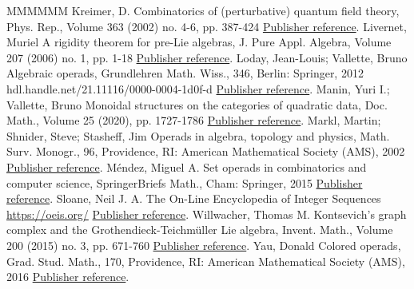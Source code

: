\documentclass[11pt]{article}
\theoremstyle{definition}
\numberwithin{equation}{section}
\begin{document}
\begin{thebibliography}{MMMMMM}
 Kreimer, D. Combinatorics of (perturbative) quantum field theory, Phys. Rep., Volume 363 (2002) no. 4-6, pp. 387-424 \href{https://alco.centre-mersenne.org/articles/10.5802/alco.442/#Kreimer:2000ja}{Publisher reference}.
 Livernet, Muriel A rigidity theorem for pre-Lie algebras, J. Pure Appl. Algebra, Volume 207 (2006) no. 1, pp. 1-18 \href{https://alco.centre-mersenne.org/articles/10.5802/alco.442/#Liv06}{Publisher reference}.
 Loday, Jean-Louis; Vallette, Bruno Algebraic operads, Grundlehren Math. Wiss., 346, Berlin: Springer, 2012 hdl.handle.net/21.11116/0000-0004-1d0f-d \href{https://alco.centre-mersenne.org/articles/10.5802/alco.442/#LV12}{Publisher reference}.
 Manin, Yuri I.; Vallette, Bruno Monoidal structures on the categories of quadratic data, Doc. Math., Volume 25 (2020), pp. 1727-1786 \href{https://alco.centre-mersenne.org/articles/10.5802/alco.442/#MV19}{Publisher reference}.
 Markl, Martin; Shnider, Steve; Stasheff, Jim Operads in algebra, topology and physics, Math. Surv. Monogr., 96, Providence, RI: American Mathematical Society (AMS), 2002 \href{https://alco.centre-mersenne.org/articles/10.5802/alco.442/#MSJ02}{Publisher reference}.
 Méndez, Miguel A. Set operads in combinatorics and computer science, SpringerBriefs Math., Cham: Springer, 2015 \href{https://alco.centre-mersenne.org/articles/10.5802/alco.442/#Men15}{Publisher reference}.
 Sloane, Neil J. A. The On-Line Encyclopedia of Integer Sequences \url{https://oeis.org/} \href{https://alco.centre-mersenne.org/articles/10.5802/alco.442/#Slo}{Publisher reference}.
 Willwacher, Thomas M. Kontsevich’s graph complex and the Grothendieck-Teichmüller Lie algebra, Invent. Math., Volume 200 (2015) no. 3, pp. 671-760 \href{https://alco.centre-mersenne.org/articles/10.5802/alco.442/#Wil05}{Publisher reference}.
 Yau, Donald Colored operads, Grad. Stud. Math., 170, Providence, RI: American Mathematical Society (AMS), 2016 \href{https://alco.centre-mersenne.org/articles/10.5802/alco.442/#DY16}{Publisher reference}.
\end{thebibliography}
\end{document}
